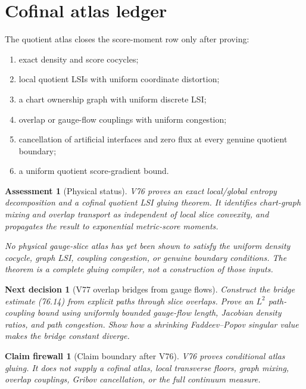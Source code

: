 \documentclass[11pt]{article}
\newtheorem{firewall}[theorem]{Claim firewall}
\newtheorem{decision}[theorem]{Next decision}
\newtheorem{assessment}[theorem]{Assessment}
\theoremstyle{remark}
\begin{document}
\section{Cofinal atlas ledger}

The quotient atlas closes the score-moment row only after proving:
\begin{enumerate}
\item exact density and score cocycles;
\item local quotient LSIs with uniform coordinate distortion;
\item a chart ownership graph with uniform discrete LSI;
\item overlap or gauge-flow couplings with uniform congestion;
\item cancellation of artificial interfaces and zero flux at
      every genuine quotient boundary;
\item a uniform quotient score-gradient bound.
\end{enumerate}

\begin{assessment}[Physical status]
\label{ass:v15v76-status}
V76 proves an exact local/global entropy decomposition and a
cofinal quotient LSI gluing theorem.  It identifies chart-graph
mixing and overlap transport as independent of local slice
convexity, and propagates the result to exponential metric-score
moments.

No physical gauge-slice atlas has yet been shown to satisfy the
uniform density cocycle, graph LSI, coupling congestion, or genuine
boundary conditions.  The theorem is a complete gluing compiler,
not a construction of those inputs.
\end{assessment}

\begin{decision}[V77 overlap bridges from gauge flows]
\label{dec:v15v76-next}
Construct the bridge estimate (76.14) from explicit paths through
slice overlaps.  Prove an \(L^2\) path-coupling bound using
uniformly bounded gauge-flow length, Jacobian density ratios, and
path congestion.  Show how a shrinking Faddeev--Popov singular
value makes the bridge constant diverge.
\end{decision}

\begin{firewall}[Claim boundary after V76]
\label{fire:v15v76}
V76 proves conditional atlas gluing.  It does not supply a cofinal
atlas, local transverse floors, graph mixing, overlap couplings,
Gribov cancellation, or the full continuum measure.
\end{firewall}
\end{document}
